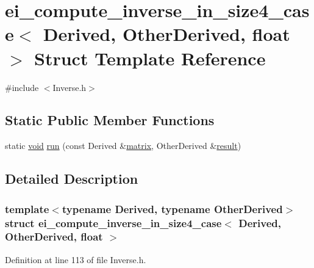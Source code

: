 \hypertarget{structei__compute__inverse__in__size4__case_3_01_derived_00_01_other_derived_00_01float_01_4}{\section{ei\-\_\-compute\-\_\-inverse\-\_\-in\-\_\-size4\-\_\-case$<$ Derived, Other\-Derived, float $>$ Struct Template Reference}
\label{structei__compute__inverse__in__size4__case_3_01_derived_00_01_other_derived_00_01float_01_4}
}


{\ttfamily \#include $<$Inverse.\-h$>$}

\subsection*{Static Public Member Functions}
\begin{DoxyCompactItemize}
\item 
static \hyperlink{group___u_a_v_objects_plugin_ga444cf2ff3f0ecbe028adce838d373f5c}{void} \hyperlink{structei__compute__inverse__in__size4__case_3_01_derived_00_01_other_derived_00_01float_01_4_afac1f7ae694378d345dca26a60955cca}{run} (const Derived \&\hyperlink{glext_8h_a7b24a3f2f56eb1244ae69dacb4fecb6f}{matrix}, Other\-Derived \&\hyperlink{qxtslotjob_8h_aab161efab0511ea9612b64c40e9852ca}{result})
\end{DoxyCompactItemize}


\subsection{Detailed Description}
\subsubsection*{template$<$typename Derived, typename Other\-Derived$>$struct ei\-\_\-compute\-\_\-inverse\-\_\-in\-\_\-size4\-\_\-case$<$ Derived, Other\-Derived, float $>$}



Definition at line 113 of file Inverse.\-h.



